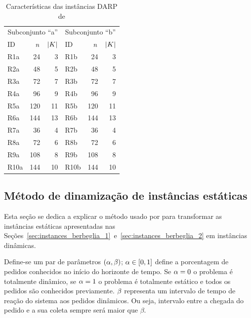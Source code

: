 \begin{table}[h]
\footnotesize
  \centering
  \caption{Características das instâncias DARP de 
           \textcite{cordeau_tabu_2003}}
  \label{tab:cordeau_tabu_2003_DARP_intances_characteristics}
  \begin{tabular}{lrr|lrr}
    \toprule  
    \multicolumn{3}{c|}{Subconjunto ``a''} & 
    \multicolumn{3}{c}{Subconjunto ``b''} \\
    ID & $n$ & $|K|$ & 
    ID & $n$ & $|K|$\\
    \midrule
      R1a  &  24 &  3 & R1b  &  24 &  3\\
      R2a  &  48 &  5 & R2b  &  48 &  5\\
      R3a  &  72 &  7 & R3b  &  72 &  7\\
      R4a  &  96 &  9 & R4b  &  96 &  9\\
      R5a  & 120 & 11 & R5b  & 120 & 11\\
      R6a  & 144 & 13 & R6b  & 144 & 13\\
      R7a  &  36 &  4 & R7b  &  36 &  4\\
      R8a  &  72 &  6 & R8b  &  72 &  6\\
      R9a  & 108 &  8 & R9b  & 108 &  8\\
      R10a & 144 & 10 & R10b & 144 & 10\\
    \bottomrule
  \end{tabular}
\end{table}

\subsection{Método de dinamização de instâncias estáticas}

Esta seção se dedica a explicar o método usado por
\textcite{berbeglia_hybrid_tabu_2012} para transformar as instâncias
estáticas apresentadas nas
Seções~\ref{sec:instances_berbeglia_1}~e~\ref{sec:instances_berbeglia_2} em
instâncias dinâmicas.

Define-se um par de parâmetros $(\alpha,\beta)$;
$\alpha \in [0, 1]$ define a porcentagem de pedidos conhecidos no 
início do horizonte de tempo.
Se $\alpha = 0$ o problema é totalmente dinâmico, 
se $\alpha = 1$ o problema é totalmente estático e todos os pedidos
são conhecidos previamente.  
$\beta$ representa um intervalo de tempo de reação do sistema aos
pedidos dinâmicos. Ou seja, intervalo entre a chegada do pedido e a sua coleta 
sempre será maior que $\beta$.

